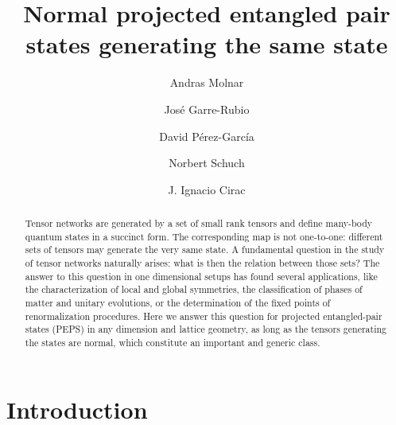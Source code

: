 \documentclass[preprint, superscriptaddress,a4paper,longbibliography]{revtex4-1}
\theoremstyle{definition}
\begin{document}
\title{Normal projected entangled pair states generating the same state}

\author{Andras Molnar}
\author{José Garre-Rubio}
\author{David Pérez-García}
\author{Norbert Schuch}
\author{J. Ignacio Cirac}




\begin{abstract}
    Tensor networks are generated by a set of small rank tensors and define many-body quantum  states in a succinct form. The corresponding map is not one-to-one: different sets of tensors may  generate the very same state. A fundamental question in the study of tensor networks naturally  arises: what is then the relation between those sets? The answer to this question in one dimensional   setups has found several applications, like the characterization of local and global symmetries,  the classification of phases of matter and unitary evolutions, or the determination of the fixed  points of renormalization procedures. Here we answer this question  for projected entangled-pair states (PEPS) in any dimension and lattice geometry, as long as the tensors generating the states are normal, which constitute an important and generic class.
\end{abstract}


\maketitle


\section{Introduction}
\end{document}
